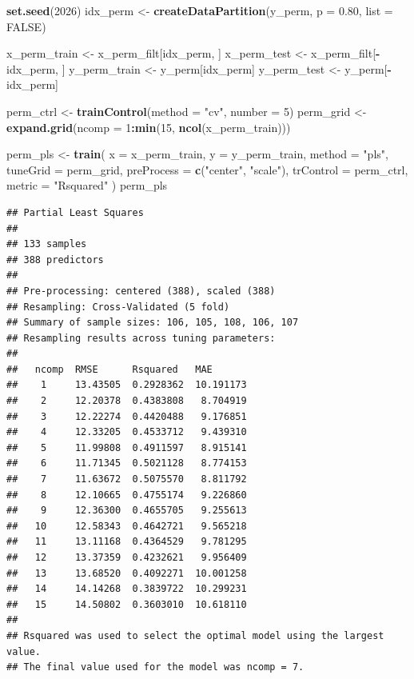 \documentclass[
  11pt,
]{article}
\newenvironment{Shaded}{\begin{snugshade}}{\end{snugshade}}
\newcommand{\AttributeTok}[1]{\textcolor[rgb]{0.13,0.29,0.53}{#1}}
\newcommand{\ConstantTok}[1]{\textcolor[rgb]{0.56,0.35,0.01}{#1}}
\newcommand{\DecValTok}[1]{\textcolor[rgb]{0.00,0.00,0.81}{#1}}
\newcommand{\FloatTok}[1]{\textcolor[rgb]{0.00,0.00,0.81}{#1}}
\newcommand{\FunctionTok}[1]{\textcolor[rgb]{0.13,0.29,0.53}{\textbf{#1}}}
\newcommand{\NormalTok}[1]{#1}
\newcommand{\OtherTok}[1]{\textcolor[rgb]{0.56,0.35,0.01}{#1}}
\newcommand{\SpecialCharTok}[1]{\textcolor[rgb]{0.81,0.36,0.00}{\textbf{#1}}}
\newcommand{\StringTok}[1]{\textcolor[rgb]{0.31,0.60,0.02}{#1}}
\begin{document}
\begin{Shaded}
\begin{Highlighting}[]
\FunctionTok{set.seed}\NormalTok{(}\DecValTok{2026}\NormalTok{)}
\NormalTok{idx\_perm }\OtherTok{\textless{}{-}} \FunctionTok{createDataPartition}\NormalTok{(y\_perm, }\AttributeTok{p =} \FloatTok{0.80}\NormalTok{, }\AttributeTok{list =} \ConstantTok{FALSE}\NormalTok{)}

\NormalTok{x\_perm\_train }\OtherTok{\textless{}{-}}\NormalTok{ x\_perm\_filt[idx\_perm, ]}
\NormalTok{x\_perm\_test  }\OtherTok{\textless{}{-}}\NormalTok{ x\_perm\_filt[}\SpecialCharTok{{-}}\NormalTok{idx\_perm, ]}
\NormalTok{y\_perm\_train }\OtherTok{\textless{}{-}}\NormalTok{ y\_perm[idx\_perm]}
\NormalTok{y\_perm\_test  }\OtherTok{\textless{}{-}}\NormalTok{ y\_perm[}\SpecialCharTok{{-}}\NormalTok{idx\_perm]}

\NormalTok{perm\_ctrl }\OtherTok{\textless{}{-}} \FunctionTok{trainControl}\NormalTok{(}\AttributeTok{method =} \StringTok{"cv"}\NormalTok{, }\AttributeTok{number =} \DecValTok{5}\NormalTok{)}
\NormalTok{perm\_grid }\OtherTok{\textless{}{-}} \FunctionTok{expand.grid}\NormalTok{(}\AttributeTok{ncomp =} \DecValTok{1}\SpecialCharTok{:}\FunctionTok{min}\NormalTok{(}\DecValTok{15}\NormalTok{, }\FunctionTok{ncol}\NormalTok{(x\_perm\_train)))}

\NormalTok{perm\_pls }\OtherTok{\textless{}{-}} \FunctionTok{train}\NormalTok{(}
  \AttributeTok{x =}\NormalTok{ x\_perm\_train,}
  \AttributeTok{y =}\NormalTok{ y\_perm\_train,}
  \AttributeTok{method =} \StringTok{"pls"}\NormalTok{,}
  \AttributeTok{tuneGrid =}\NormalTok{ perm\_grid,}
  \AttributeTok{preProcess =} \FunctionTok{c}\NormalTok{(}\StringTok{"center"}\NormalTok{, }\StringTok{"scale"}\NormalTok{),}
  \AttributeTok{trControl =}\NormalTok{ perm\_ctrl,}
  \AttributeTok{metric =} \StringTok{"Rsquared"}
\NormalTok{)}
\NormalTok{perm\_pls}
\end{Highlighting}
\end{Shaded}

\begin{verbatim}
## Partial Least Squares 
## 
## 133 samples
## 388 predictors
## 
## Pre-processing: centered (388), scaled (388) 
## Resampling: Cross-Validated (5 fold) 
## Summary of sample sizes: 106, 105, 108, 106, 107 
## Resampling results across tuning parameters:
## 
##   ncomp  RMSE      Rsquared   MAE      
##    1     13.43505  0.2928362  10.191173
##    2     12.20378  0.4383808   8.704919
##    3     12.22274  0.4420488   9.176851
##    4     12.33205  0.4533712   9.439310
##    5     11.99808  0.4911597   8.915141
##    6     11.71345  0.5021128   8.774153
##    7     11.63672  0.5075570   8.811792
##    8     12.10665  0.4755174   9.226860
##    9     12.36300  0.4655705   9.255613
##   10     12.58343  0.4642721   9.565218
##   11     13.11168  0.4364529   9.781295
##   12     13.37359  0.4232621   9.956409
##   13     13.68520  0.4092271  10.001258
##   14     14.14268  0.3839722  10.299231
##   15     14.50802  0.3603010  10.618110
## 
## Rsquared was used to select the optimal model using the largest value.
## The final value used for the model was ncomp = 7.
\end{verbatim}
\end{document}

